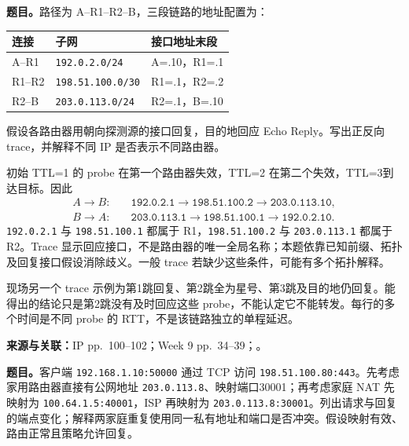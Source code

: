 \textbf{题目。}路径为 A--R1--R2--B，三段链路的地址配置为：
\begin{center}
\small
\begin{tabular}{@{}lll@{}}
\toprule
连接 & 子网 & 接口地址末段 \\
\midrule
A--R1 & \texttt{192.0.2.0/24} & A=.10，R1=.1 \\
R1--R2 & \texttt{198.51.100.0/30} & R1=.1，R2=.2 \\
R2--B & \texttt{203.0.113.0/24} & R2=.1，B=.10 \\
\bottomrule
\end{tabular}
\end{center}
假设各路由器用朝向探测源的接口回复，目的地回应 Echo Reply。写出正反向 trace，并解释不同 IP 是否表示不同路由器。

\begin{workedsolution}
初始 TTL=1 的 probe 在第一个路由器失效，TTL=2 在第二个失效，TTL=3到达目标。因此
\begin{align*}
 A\to B:\quad &\texttt{192.0.2.1}\to\texttt{198.51.100.2}\to\texttt{203.0.113.10},\\
 B\to A:\quad &\texttt{203.0.113.1}\to\texttt{198.51.100.1}\to\texttt{192.0.2.10}.
\end{align*}
\texttt{192.0.2.1} 与 \texttt{198.51.100.1} 都属于 R1，\texttt{198.51.100.2} 与 \texttt{203.0.113.1} 都属于 R2。Trace 显示回应接口，不是路由器的唯一全局名称；本题依靠已知前缀、拓扑及回复接口假设消除歧义。一般 trace 若缺少这些条件，可能有多个拓扑解释。

现场另一个 trace 示例为第1跳回复、第2跳全为星号、第3跳及目的地仍回复。能得出的结论只是第2跳没有及时回应这些 probe，不能认定它不能转发。每行的多个时间是不同 probe 的 RTT，不是该链路独立的单程延迟。
\end{workedsolution}


\textbf{来源与关联：}IP pp.~100--102；Week 9 pp.~34--39；。

\textbf{题目。}客户端 \texttt{192.168.1.10:50000} 通过 TCP 访问 \texttt{198.51.100.80:443}。先考虑家用路由器直接有公网地址 \texttt{203.0.113.8}、映射端口30001；再考虑家庭 NAT 先映射为 \texttt{100.64.1.5:40001}，ISP 再映射为 \texttt{203.0.113.8:30001}。列出请求与回复的端点变化；解释两家庭重复使用同一私有地址和端口是否冲突。假设映射有效、路由正常且策略允许回复。

